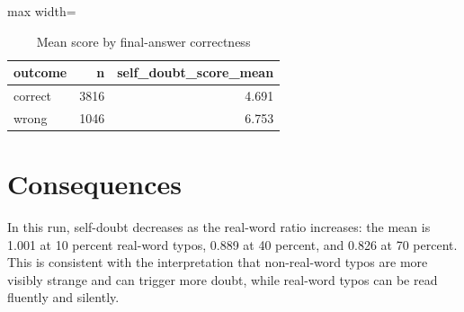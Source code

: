 \documentclass[11pt]{article}
\begin{document}
\begin{table}[H]
\centering
\caption{Mean score by final-answer correctness}
\small
\begin{adjustbox}{max width=\textwidth}
\begin{tabular}{lrr}
\toprule
\textbf{outcome} & \textbf{n} & \textbf{self\_doubt\_score\_mean} \\
\midrule
correct & 3816 & 4.691 \\
wrong & 1046 & 6.753 \\
\bottomrule
\end{tabular}
\end{adjustbox}
\end{table}

\section*{Consequences} In this run, self-doubt decreases as the real-word ratio increases: the mean is 1.001 at 10 percent real-word typos, 0.889 at 40 percent, and 0.826 at 70 percent. This is consistent with the interpretation that non-real-word typos are more visibly strange and can trigger more doubt, while real-word typos can be read fluently and silently.
\end{document}
